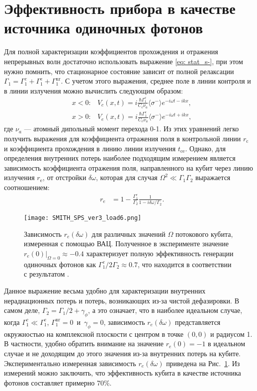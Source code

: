 \section{Эффективность прибора в качестве источника одиночных фотонов}
Для полной характеризации коэффициентов прохождения и отражения непрерывных волн достаточно использовать выражение \eqref{eq: stat_s-}, при этом нужно помнить, что стационарное состояние зависит от полной релаксации $\Gamma_1 = \Gamma_1^c + \Gamma_1^e + \Gamma_1^{\text{nr}}$. С учетом этого выражения, среднее поле в линии контроля и в линии излучения \cite{peng2016tuneable} можно вычислить следующим образом:
\begin{subequations}\label{coherentwaves}
	\begin{eqnarray}
		&x < 0: &V_{c}(x,t)=i\frac{\hbar\Gamma_1^{c}}{C_{c} \nu_{a}}\langle\sigma^{-}\rangle e^{-i\omega t - ikx}, \\
		&x > 0:  &V_{e}(x,t)=i\frac{\hbar\Gamma_1^{e}}{C_{e} \nu_{a}}\langle\sigma^{-}\rangle e^{-i\omega t + ikx},
	\end{eqnarray}
\end{subequations}
где $\nu_a$ --- атомный дипольный момент перехода 0-1. 
Из этих уравнений легко получить выражения для коэффициента отражения поля в контрольной линии $r_{\text{c}}$ и коэффициента прохождения в линию линии излучения $t_{\text{ce}}$. Однако, для определения внутренних потерь наиболее подходящим измерением является зависимость коэффициента отражения поля, направленного на кубит через линию излучения $r_{\text{e}}$, от отстройки $\delta\omega$, которая для случая $\Omega^2\ll\Gamma_1\Gamma_2$ выражается соотношением:
\begin{eqnarray}
	&r_e& = 1-\frac{\Gamma_1^e}{\Gamma_2}\frac{1}{1-i\delta\omega/\Gamma_2}.\label{re}
\end{eqnarray}
\begin{figure}[!h]
	\centering
	\texttt{[image: SMITH\_SPS\_ver3\_load6.png]}
	\caption[Зависимость $r_e(\delta\omega)$, измеренная с помощью ВАЦ]{Зависимость $r_e(\delta\omega)$ для различных значений $\Omega$ потокового кубита, измеренная с помощью ВАЦ. Полученное в эксперименте значение $\left. r_e(0)\right\vert_{\Omega=0}\approx-0.4$ характеризует полную эффективность генерации одиночных фотонов как $\Gamma^e_1/2\Gamma_2 \approx 0.7$, что находится в соответствии с результатом \cite{peng2016tuneable}. }
	\label{fig: eff}
\end{figure}
Данное выражение весьма удобно для характеризации внутренних нерадиационных потерь и потерь, возникающих из-за чистой дефазировки. В самом деле, $\Gamma_2 = \Gamma_1/2 + \gamma_\phi $, а это означает, что в наиболее идеальном случае, когда $\Gamma_1^c \ll \Gamma_1^e$, $\Gamma_1^{\text{nr}}=0$~и~$\gamma_\phi=0$, зависимость $r_e(\delta\omega)$ представляется окружностью на комплексной плоскости с центром в точке $(0,0)$ и радиусом 1. В частности, удобно обратить внимание на значение $r_e(0)=-1$ в идеальном случае и не доходящим до этого значения из-за внутренних потерь на кубите. Экспериментально измеренная зависимость $r_e(\delta\omega)$ приведена на Рис.~\ref{fig: eff}. Из измерений можно заключить, что эффективность кубита в качестве источника фотонов составляет примерно 70\%. 

